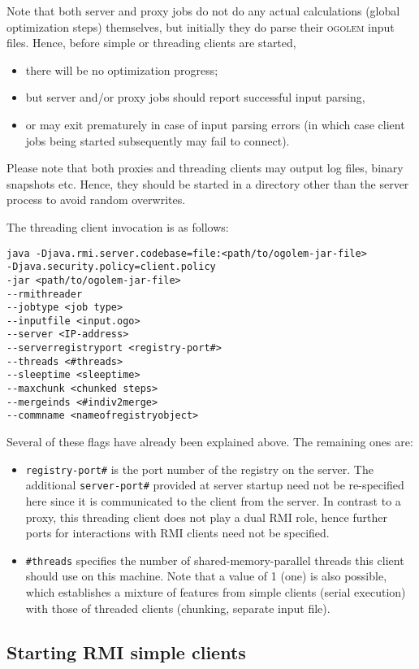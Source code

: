 \documentclass[a4paper,10pt]{scrbook}
\newcommand{\ogo}{\textsc{ogolem}}
\begin{document}
Note that both server and proxy jobs do not do any actual calculations (global
optimization steps) themselves, but initially they do parse their \ogo{} input
files. Hence, before simple or threading clients are started,
\begin{itemize}
\item there will be no optimization progress;
\item but server and/or proxy jobs should report successful input parsing,
\item or may exit prematurely in case of input parsing errors (in which case
  client jobs being started subsequently may fail to connect).
\end{itemize}
Please note that both proxies and threading clients may output log files,
binary snapshots etc. Hence, they should be started in a directory other than 
the server process to avoid random overwrites.

The threading client invocation is as follows:
\begin{verbatim}
java -Djava.rmi.server.codebase=file:<path/to/ogolem-jar-file> 
-Djava.security.policy=client.policy 
-jar <path/to/ogolem-jar-file> 
--rmithreader 
--jobtype <job type> 
--inputfile <input.ogo> 
--server <IP-address>
--serverregistryport <registry-port#>
--threads <#threads> 
--sleeptime <sleeptime>
--maxchunk <chunked steps>
--mergeinds <#indiv2merge>
--commname <nameofregistryobject>
\end{verbatim}
Several of these flags have already been explained above. The remaining ones
are: 
\begin{itemize}
\item \texttt{registry-port\#} is the port number of the registry on the
  server. The additional \texttt{server-port\#} provided at server startup need
  not be re-specified here since it is communicated to the client from the
  server. In contrast to a proxy, this threading client does not play a dual
  RMI role, hence further ports for interactions with RMI clients need not be
  specified. 
\item \texttt{\#threads} specifies the number of shared-memory-parallel threads
  this client should use on this machine. Note that a value of 1 (one) is
  also possible, which establishes a mixture of features from simple clients
  (serial execution) with those of threaded clients (chunking, separate input
  file).
\end{itemize}

\subsection{Starting RMI simple clients}
\end{document}
